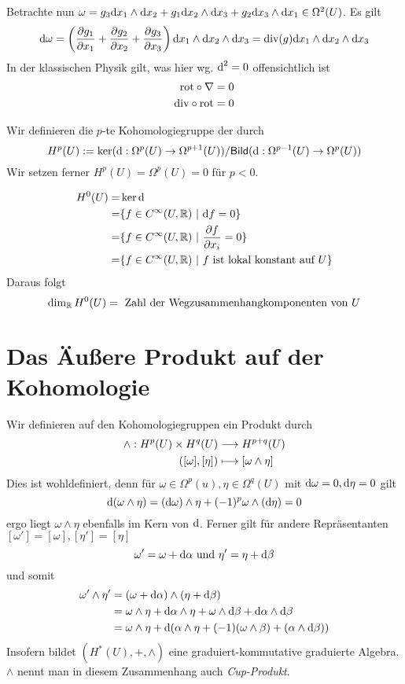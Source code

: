 Betrachte nun $\omega = g_3 \text{d} x_1 \wedge \text{d} x_2+ g_1 \text{d} x_2 \wedge \text{d} x_3 +  g_2 \text{d} x_3 \wedge \text{d} x_1\in \Omega^2(U)$. Es gilt
\[ \text{d} \omega = \left( \frac{\partial g_1}{\partial x_1} + \frac{\partial g_2}{\partial x_2 } + \frac{\partial g_3}{\partial x_3} \right) \text{d} x_1 \wedge \text{d} x_2 \wedge \text{d} x_3 = \text{div}(g)  \text{d} x_1 \wedge \text{d} x_2 \wedge \text{d} x_3  \]
In der klassischen Physik gilt, was hier wg. $\text{d}^2 = 0$ offensichtlich ist
\begin{align*}
\text{rot} \circ \nabla &= 0\\
\text{div} \circ \text{rot} &= 0
\end{align*}

\Def{}
Wir definieren die $p$-te Kohomologiegruppe der  durch
\[ H^p(U) := \ker (\text{d} : \Omega^p(U) \overset{}{\rightarrow} \Omega^{p+1} (U)) / \textsf{Bild}(\text{d} : \Omega^{p-1}(U) \overset{}{\rightarrow} \Omega^p(U) ) \]
Wir setzen ferner $H^p(U) = \Omega^p(U) = 0$ für $p < 0$.

\Bem{}
\begin{align*}
	H^0(U) = & \ker \text{d}                                                           \\
	=        & \{f \in C^\infty (U,\mathbb{R})~|~\text{d} f = 0\}                              \\
	=        & \{f \in C^\infty (U,\mathbb{R})~|~ \frac{\partial f}{\partial x_i} = 0 \} \\
	=        & \{f \in C^\infty (U,\mathbb{R})~|~ f\text{ ist lokal konstant auf }U \}
\end{align*}
Daraus folgt
\[ \dim_{\mathbb{R}} H^0(U) = \text{ Zahl der Wegzusammenhangkomponenten von }U \]

\section{Das Äußere Produkt auf der Kohomologie}
\Def{}
Wir definieren auf den Kohomologiegruppen ein Produkt durch
\begin{align*}
\wedge : H^p(U) \times H^q(U) & \overset{}{\longrightarrow} H^{p+q}(U)\\
([\omega], [\eta]) & \longmapsto [\omega\wedge \eta]
\end{align*}
Dies ist wohldefiniert, denn für $\omega\in \Omega^p(u), \eta\in \Omega^q(U)$ mit $\text{d} \omega = 0, \text{d} \eta = 0$ gilt
\[ \text{d} (\omega \wedge \eta) = (\text{d} \omega) \wedge \eta + (-1)^p \omega \wedge (\text{d} \eta) = 0 \]
ergo liegt $\omega \wedge \eta$ ebenfalls im Kern von $\text{d}$. Ferner gilt für andere Repräsentanten $[\omega'] = [\omega], [\eta'] = [\eta]$
\[ \omega' = \omega + \text{d} \alpha \text{ und }\eta' = \eta + \text{d} \beta \]
und somit
\begin{align*}
\omega'\wedge \eta' &= (\omega + \text{d} \alpha)\wedge (\eta + \text{d} \beta) \\
&= \omega \wedge \eta + \text{d} \alpha \wedge \eta + \omega \wedge \text{d} \beta + \text{d} \alpha \wedge \text{d} \beta\\
 &= \omega \wedge \eta + \text{d}(\alpha \wedge \eta + (-1)(\omega \wedge \beta) + (\alpha\wedge \text{d} \beta) )
\end{align*}
Insofern bildet $(H^*(U), +, \wedge)$ eine graduiert-kommutative graduierte Algebra. $\wedge$ nennt man in diesem Zusammenhang auch \textit{Cup-Produkt}.

